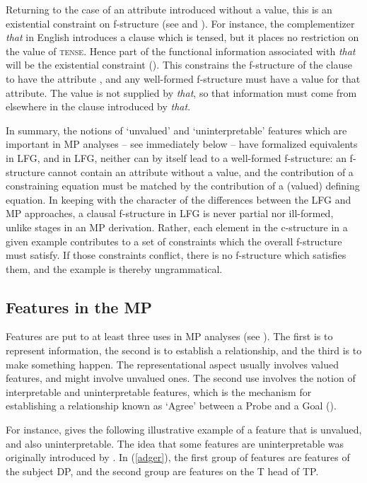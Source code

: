 \documentclass[output=paper,hidelinks]{langscibook}
\begin{document}
Returning to the case of an attribute introduced without a value, this
is an existential constraint on f-structure
(see \citealp[210ff.]{kaplanbresnan82} and
\citealp[112--114]{dalrymple01}). For instance, the complementizer {\it
  that\/} in English introduces a clause which is tensed, but it
places no restriction on the value of \textsc{tense}. Hence part of
the functional information associated with {\it that\/} will be the
existential constraint {(\UP\TENSE)}. This constrains the
f-structure of the clause to have the attribute \TENSE, and any
well-formed f-structure must have a value for that attribute. The
value is not supplied by {\it that\/}, so that information must come
from elsewhere in the clause introduced by {\it that\/}.

In summary, the notions of `unvalued' and `uninterpretable' features
which are important in MP analyses -- see immediately below -- have
formalized equivalents in LFG, and in LFG, neither can by
itself lead to a well-formed f-structure: an f-structure cannot
contain an attribute without a value, and the contribution of a
constraining equation must be matched by the contribution of a
(valued) defining equation. In keeping with the character of the
differences between the LFG and MP approaches, a clausal f-structure
in LFG is never partial nor ill-formed, unlike stages in an MP
derivation. Rather, each element in the c-structure in a given example
contributes to a set of constraints which the overall f-structure must
satisfy. If those constraints conflict, there is no f-structure which
satisfies them, and the example is thereby ungrammatical.

\subsection{Features in the MP}
\label{sec:minimalism:features-mp}
\largerpage[2]
Features are put to at least three uses in MP analyses (see
\citealp[200--212]{adger10}). The first is to represent information,
the second is to establish a relationship, and the third is to make
something happen. The representational aspect usually involves valued
features, and might involve unvalued ones. The second use involves the
notion of interpretable and uninterpretable features, which is the
mechanism for establishing a relationship known as `Agree' between a
Probe and a Goal (\citealp[101]{chomsky00}).

For instance, \citet[189]{adger10} gives the following illustrative
example of a feature that is unvalued, and also uninterpretable. The
idea that some features are uninterpretable was originally introduced
by \citet[277--278]{chomsky1995the-minimalist}. In (\ref{adger}), the
first group of features are features of the subject DP, and the second
group are features on the T head of TP.
\end{document}
